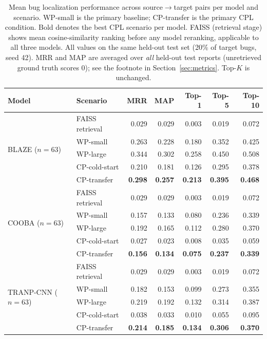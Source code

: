 \documentclass[a4paper,fleqn]{cas-dc}
\begin{document}
\begin{table}[t]
\centering
\caption{Mean bug localization performance across source$\to$target pairs per model and
scenario. WP-small is the primary baseline; CP-transfer is the primary CPL condition.
Bold denotes the best CPL scenario per model.
FAISS (retrieval stage) shows mean cosine-similarity ranking before any model reranking,
applicable to all three models. All values
on the same held-out test set (20\% of target bugs, seed 42).
MRR and MAP are averaged over \emph{all} held-out test reports (unretrieved ground
truth scores $0$); see the footnote in Section~\ref{sec:metrics}. Top-$K$ is unchanged.}
\label{tab:scenario_means}
\small
\begin{tabular}{@{}llrrrrr@{}}
\toprule
\textbf{Model} & \textbf{Scenario} & \textbf{MRR} & \textbf{MAP} & \textbf{Top-1} & \textbf{Top-5} & \textbf{Top-10} \\
\midrule
\multirow{5}{*}{BLAZE ($n=63$)}
  & FAISS retrieval & 0.029 & 0.029 & 0.003 & 0.019 & 0.072 \\
  & WP-small      & 0.263 & 0.228 & 0.180 & 0.352 & 0.425 \\
  & WP-large      & 0.344 & 0.302 & 0.258 & 0.450 & 0.508 \\
  & CP-cold-start & 0.210 & 0.181 & 0.126 & 0.295 & 0.378 \\
  & CP-transfer   & \textbf{0.298} & \textbf{0.257} & \textbf{0.213} & \textbf{0.395} & \textbf{0.468} \\
\midrule
\multirow{5}{*}{COOBA ($n=63$)}
  & FAISS retrieval & 0.029 & 0.029 & 0.003 & 0.019 & 0.072 \\
  & WP-small      & 0.157 & 0.133 & 0.080 & 0.236 & 0.339 \\
  & WP-large      & 0.192 & 0.165 & 0.112 & 0.280 & 0.370 \\
  & CP-cold-start & 0.027 & 0.023 & 0.008 & 0.035 & 0.059 \\
  & CP-transfer   & \textbf{0.156} & \textbf{0.134} & \textbf{0.075} & \textbf{0.237} & \textbf{0.339} \\
\midrule
\multirow{5}{*}{TRANP-CNN ($n=63$)}
  & FAISS retrieval & 0.029 & 0.029 & 0.003 & 0.019 & 0.072 \\
  & WP-small      & 0.182 & 0.153 & 0.099 & 0.273 & 0.355 \\
  & WP-large      & 0.219 & 0.192 & 0.132 & 0.314 & 0.387 \\
  & CP-cold-start & 0.038 & 0.033 & 0.010 & 0.055 & 0.095 \\
  & CP-transfer   & \textbf{0.214} & \textbf{0.185} & \textbf{0.134} & \textbf{0.306} & \textbf{0.370} \\
\bottomrule
\end{tabular}
\end{table}
\end{document}
